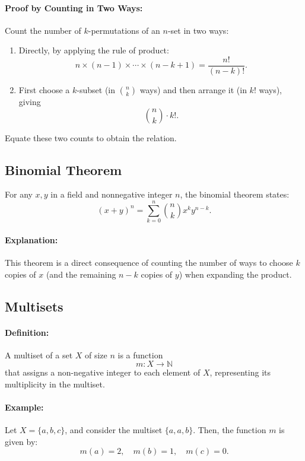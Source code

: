 \documentclass{article}
\begin{document}
\paragraph{Proof by Counting in Two Ways:}  
Count the number of $k$-permutations of an $n$-set in two ways:
\begin{enumerate}[label=(\arabic*)]
    \item Directly, by applying the rule of product:
    \[
    n \times (n-1) \times \cdots \times (n-k+1) = \frac{n!}{(n-k)!}.
    \]
    \item First choose a $k$-subset (in $\binom{n}{k}$ ways) and then arrange it (in $k!$ ways), giving
    \[
    \binom{n}{k} \cdot k!.
    \]
\end{enumerate}
Equate these two counts to obtain the relation.

\subsection{Binomial Theorem}
For any $x,y$ in a field and nonnegative integer $n$, the binomial theorem states:
\[
(x+y)^n = \sum_{k=0}^{n} \binom{n}{k} x^k y^{n-k}.
\]
\paragraph{Explanation:}  
This theorem is a direct consequence of counting the number of ways to choose $k$ copies of $x$ (and the remaining $n-k$ copies of $y$) when expanding the product.

\subsection{Multisets}  

\paragraph{Definition:}  
A multiset of a set \( X \) of size \( n \) is a function  
\[
m: X \to \mathbb{N}
\]
that assigns a non-negative integer to each element of \( X \), representing its multiplicity in the multiset.  

\paragraph{Example:}  
Let \( X = \{a, b, c\} \), and consider the multiset \( \{a, a, b\} \). Then, the function \( m \) is given by:  
\[
m(a) = 2, \quad m(b) = 1, \quad m(c) = 0.
\]  
\end{document}
